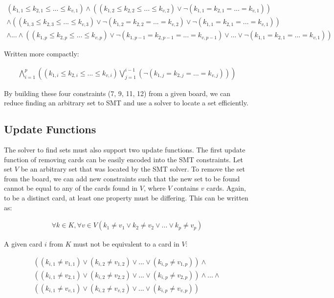 \documentclass[pageno]{jpaper}
\begin{document}
\begin{multline}
	(k_{1,1} \leq k_{2,1} \leq ... \leq k_{v,1}) \wedge (   (k_{1,2} \leq k_{2,2} \leq ... \leq k_{v,2})  \vee \neg (k_{1,1} = k_{2,1} = ... = k_{v,1})) \\
	\wedge (   (k_{1,3} \leq k_{2,3} \leq ... \leq k_{v,3})  \vee \neg (k_{1,2} = k_{2,2} = ... = k_{v,2}) \vee \neg (k_{1,1} = k_{2,1} = ... = k_{v,1})) \\
	\wedge ... \wedge (   (k_{1,p} \leq k_{2,p} \leq ... \leq k_{v,p})  \vee \neg (k_{1,p-1} = k_{2,p-1} = ... = k_{v,p-1}) \vee ... \vee \neg (k_{1,1} = k_{2,1} = ... = k_{v,1}))
\end{multline}

Written more compactly:

\begin{align}
	\bigwedge \limits_{i=1}^{p}   \left(  (k_{1,i} \leq k_{2,i} \leq ... \leq k_{v,i}) \bigvee \limits_{j=1}^{i-1}  \left( \neg (k_{1,j} = k_{2,j} = ... = k_{v,j})  \right)   \right)
\end{align}

By building these four constraints (7, 9, 11, 12) from a given board, we can reduce finding an arbitrary set to SMT and use a solver to locate a set efficiently. 


\subsection{Update Functions} 
The solver to find sets must also support two update functions. The first update function of removing cards can be easily encoded into the SMT constraints. Let set $V$ be an arbitrary set that was located by the SMT solver. To remove the set from the board, we can add new constraints such that the new set to be found cannot be equal to any of the cards found in $V$, where $V$ contains $v$ cards. Again, to be a distinct card, at least one property must be differing. This can be written as:

\begin{align}
	\forall k \in K, \forall v \in V \left (k_1 \neq v_1 \vee k_2 \neq v_2 \vee ... \vee k_p \neq v_p \right)
\end{align}

A given card $i$ from $K$ must not be equivalent to a card in $V$:

\begin{multline}
	((k_{i,1} \neq v_{1,1}) \vee (k_{i,2} \neq v_{1,2}) \vee ... \vee (k_{i,p} \neq v_{1,p})) \wedge \\
	 ((k_{i,1} \neq v_{2,1}) \vee (k_{i,2} \neq v_{2,2}) \vee ... \vee (k_{i,p} \neq v_{2,p}))  \wedge ... \wedge \\ ((k_{i,1} \neq v_{v,1}) \vee (k_{i,2} \neq v_{v,2}) \vee ... \vee (k_{i,p} \neq v_{v,p})) 
\end{multline}
\end{document}
